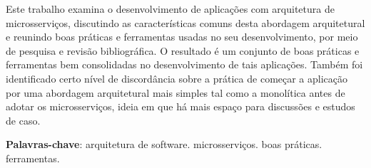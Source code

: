 \setlength{\absparsep}{18pt} %
\begin{resumo}

Este trabalho examina o desenvolvimento de aplicações com arquitetura de microsserviços, discutindo as características comuns desta abordagem arquitetural e reunindo boas práticas e ferramentas usadas no seu desenvolvimento, por meio de pesquisa e revisão bibliográfica. O resultado é um conjunto de boas práticas e ferramentas bem consolidadas no desenvolvimento de tais aplicações. Também foi identificado certo nível de discordância sobre a prática de começar a aplicação por uma abordagem arquitetural mais simples tal como a monolítica antes de adotar os microsserviços, ideia em que há mais espaço para discussões e estudos de caso. 


 \textbf{Palavras-chave}: arquitetura de software. microsserviços. boas práticas. ferramentas.
\end{resumo}